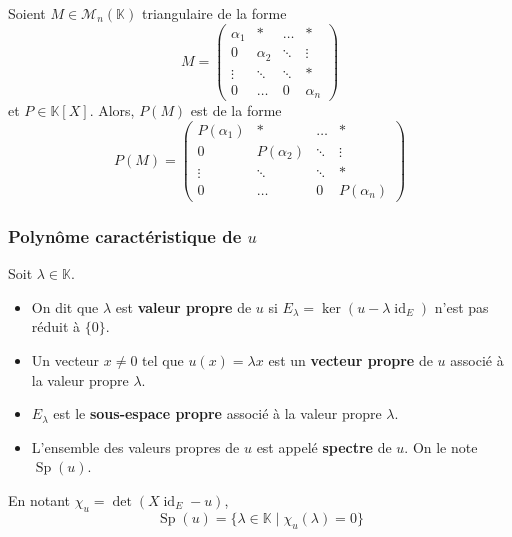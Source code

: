	\begin{proposition}
		Soient $M \in \mathcal{M}_n(\mathbb{K})$ triangulaire de la forme
		\[
			M = \begin{pmatrix}
				\alpha_1 & * & \dots & * \\
				0 & \alpha_2 & \ddots & \vdots \\
				\vdots & \ddots & \ddots & * \\
				0 & \dots & 0 & \alpha_n
			\end{pmatrix}
		\]
		et $P \in \mathbb{K}[X]$. Alors, $P(M)$ est de la forme
		\[
		P(M) = \begin{pmatrix}
			P(\alpha_1) & * & \dots & * \\
			0 & P(\alpha_2) & \ddots & \vdots \\
			\vdots & \ddots & \ddots & * \\
			0 & \dots & 0 & P(\alpha_n)
		\end{pmatrix}
		\]
	\end{proposition}

	\subsubsection{Polynôme caractéristique de \texorpdfstring{$u$}{u}}


	\begin{definition}
		\label{150-1}
		Soit $\lambda \in \mathbb{K}$.
		\begin{itemize}
			\item On dit que $\lambda$ est \textbf{valeur propre} de $u$ si $E_\lambda = \ker(u - \lambda \operatorname{id}_E)$ n'est pas réduit à $\{ 0 \}$.
			\item Un vecteur $x \neq 0$ tel que $u(x) = \lambda x$ est un \textbf{vecteur propre} de $u$ associé à la valeur propre $\lambda$.
			\item $E_\lambda$ est le \textbf{sous-espace propre} associé à la valeur propre $\lambda$.
			\item L'ensemble des valeurs propres de $u$ est appelé \textbf{spectre} de $u$. On le note $\operatorname{Sp}(u)$.
		\end{itemize}
	\end{definition}

	\begin{proposition}
		En notant $\chi_u = \det(X \operatorname{id}_E - u)$,
		\[ \operatorname{Sp}(u) = \{ \lambda \in \mathbb{K} \mid \chi_u(\lambda) = 0 \} \]
	\end{proposition}

